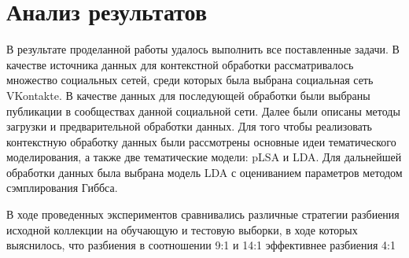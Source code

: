 \documentclass[a4paper]{report}
\begin{document}
	 
	 
	
	
	
	
	
	
	

	
		

	
	\newpage
	\section{Анализ результатов}
	
	В результате проделанной работы удалось выполнить все поставленные задачи. В качестве источника данных для контекстной обработки рассматривалось множество социальных сетей, среди которых была выбрана социальная сеть VKontakte. В качестве данных для последующей обработки были выбраны публикации в  сообществах данной социальной сети. Далее были описаны методы загрузки и предварительной обработки данных. 
	Для того чтобы реализовать контекстную обработку данных были рассмотрены основные идеи тематического моделирования, а также две тематические модели: pLSA и LDA. Для дальнейшей обработки данных была выбрана модель LDA с оцениванием параметров методом сэмплирования Гиббса. 
	
	В ходе проведенных экспериментов сравнивались различные стратегии разбиения исходной коллекции на обучающую и тестовую выборки, в ходе которых выяснилось, что разбиения в соотношении 9:1 и 14:1 эффективнее разбиения 4:1
	
	
	
	
	
\end{document}
